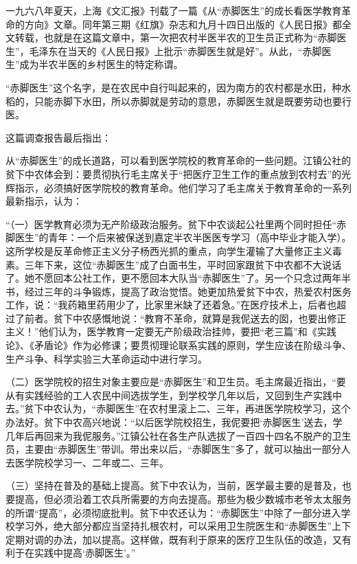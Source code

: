 \begin{maonote}
一九六八年夏天，上海《文汇报》刊载了一篇《从“赤脚医生”的成长看医学教育革命的方向》文章。同年第三期《红旗》杂志和九月十四日出版的《人民日报》都全文转载，也就是在这篇文章中，第一次把农村半医半农的卫生员正式称为“赤脚医生”，毛泽东在当天的《人民日报》上批示“赤脚医生就是好”。从此，“赤脚医生”成为半农半医的乡村医生的特定称谓。

“赤脚医生”这个名字，是在农民中自行叫起来的，因为南方的农村都是水田，种水稻的，只能赤脚下水田，所以赤脚就是劳动的意思，赤脚医生就是既要劳动也要行医。

这篇调查报告最后指出：

从“赤脚医生”的成长道路，可以看到医学院校的教育革命的一些问题。江镇公社的贫下中农体会到：要贯彻执行毛主席关于“把医疗卫生工作的重点放到农村去”的光辉指示，必须搞好医学院校的教育革命。他们学习了毛主席关于教育革命的一系列最新指示，认为：

“（一）医学教育必须为无产阶级政治服务。贫下中农谈起公社里两个同时担任“赤脚医生”的青年：一个后来被保送到嘉定半农半医医专学习（高中毕业才能入学）。这所学校是反革命修正主义分子杨西光抓的重点，向学生灌输了大量修正主义毒素。三年下来，这位“赤脚医生”成了白面书生，平时回家跟贫下中农都不大说话了。她不愿回本公社工作，更不愿回本大队当“赤脚医生”了。另一个只念过两年半书，经过三年的斗争锻炼，提高了政治觉悟。她更加热爱贫下中农，热爱农村医务工作，说：“我药箱里药用少了，比家里米缺了还着急。”在医疗技术上，后者也超过了前者。贫下中农感慨地说：“教育不革命，就算是我伲送去的囡，也要出修正主义！”他们认为，医学教育一定要无产阶级政治挂帅，要把“老三篇”和《实践论》、《矛盾论》作为必修课；要贯彻理论联系实践的原则，学生应该在阶级斗争、生产斗争、科学实验三大革命运动中进行学习。

（二）医学院校的招生对象主要应是“赤脚医生”和卫生员。毛主席最近指出，“要从有实践经验的工人农民中间选拔学生，到学校学几年以后，又回到生产实践中去。”贫下中农认为，“赤脚医生”在农村里滚上二、三年，再进医学院校学习，这个办法好。贫下中农高兴地说：“以后医学院校招生，我伲要把‘赤脚医生’送去，学几年后再回来为我伲服务。”江镇公社在各生产队选拔了一百四十四名不脱产的卫生员，主要由“赤脚医生”带训。带出来以后，“赤脚医生”多了，就可以抽出一部分人去医学院校学习一、二年或二、三年。

（三）坚持在普及的基础上提高。贫下中农认为，当前，医学最主要的是普及，也要提高，但必须沿着工农兵所需要的方向去提高。那些为极少数城市老爷太太服务的所谓“提高”，必须彻底批判。贫下中农还认为：“赤脚医生”中除了一部分进入学校学习外，绝大部分都应当坚持扎根农村，可以采用卫生院医生和“赤脚医生”上下定期对调的办法，加以提高。这样做，既有利于原来的医疗卫生队伍的改造，又有利于在实践中提高‘赤脚医生’。”


\end{maonote}
